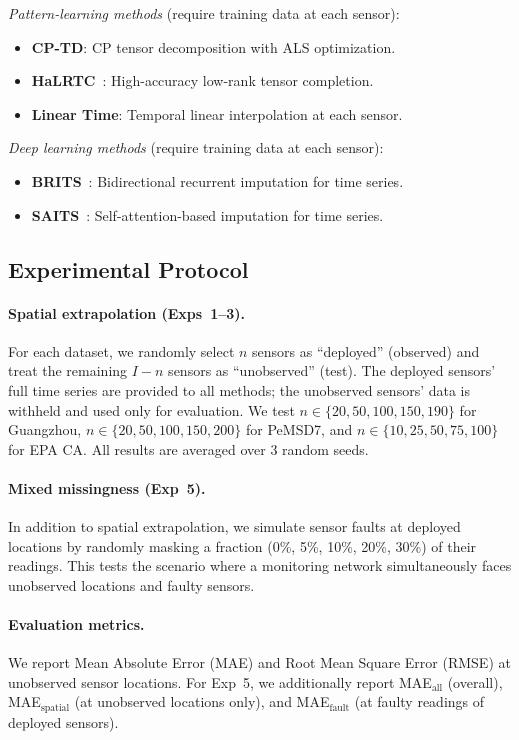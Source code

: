 \documentclass[journal]{IEEEtran}
\begin{document}
\emph{Pattern-learning methods} (require training data at each sensor):
\begin{itemize}
\item \textbf{CP-TD}: CP tensor decomposition with ALS optimization.
\item \textbf{HaLRTC}~\cite{liu2013tensor}: High-accuracy low-rank tensor completion.
\item \textbf{Linear Time}: Temporal linear interpolation at each sensor.
\end{itemize}

\emph{Deep learning methods} (require training data at each sensor):
\begin{itemize}
\item \textbf{BRITS}~\cite{cao2018brits}: Bidirectional recurrent imputation for time series.
\item \textbf{SAITS}~\cite{du2023saits}: Self-attention-based imputation for time series.
\end{itemize}

\subsection{Experimental Protocol}

\paragraph{Spatial extrapolation (Exps~1--3).}
For each dataset, we randomly select $n$ sensors as ``deployed'' (observed) and treat the remaining $I - n$ sensors as ``unobserved'' (test). The deployed sensors' full time series are provided to all methods; the unobserved sensors' data is withheld and used only for evaluation. We test $n \in \{20, 50, 100, 150, 190\}$ for Guangzhou, $n \in \{20, 50, 100, 150, 200\}$ for PeMSD7, and $n \in \{10, 25, 50, 75, 100\}$ for EPA CA. All results are averaged over 3 random seeds.

\paragraph{Mixed missingness (Exp~5).}
In addition to spatial extrapolation, we simulate sensor faults at deployed locations by randomly masking a fraction (0\%, 5\%, 10\%, 20\%, 30\%) of their readings. This tests the scenario where a monitoring network simultaneously faces unobserved locations and faulty sensors.

\paragraph{Evaluation metrics.}
We report Mean Absolute Error (MAE) and Root Mean Square Error (RMSE) at unobserved sensor locations. For Exp~5, we additionally report MAE$_{\text{all}}$ (overall), MAE$_{\text{spatial}}$ (at unobserved locations only), and MAE$_{\text{fault}}$ (at faulty readings of deployed sensors).
\end{document}

